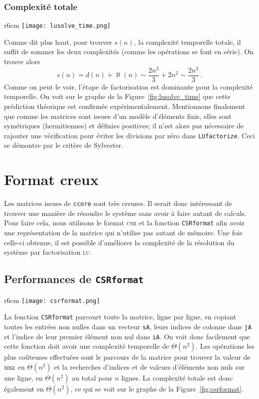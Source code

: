 \documentclass[11pt]{article}
\begin{document}
\subsubsection{Complexité totale}
\begin{wrapfigure}{r}{6cm}
	\centering
	\texttt{[image: lusolve\_time.png]}
	\caption{Temps d'exécution de \lstinline|LUsolve| en fonction de $n$. La pente de $3$ montre la relation cubique.}
	\label{fig:lusolve_time}
\end{wrapfigure}
Comme dit plus haut, pour trouver $s(n)$, la complexité temporelle totale, il suffit de sommer les deux complexités (comme les opérations se font en série).
On trouve alors
\[
s(n) = d(n) + \aleph(n) \sim \frac{2n^3}{3} + 2n^2 \sim \frac{2n^3}{3}\,.
\]
Comme on peut le voir, l'étape de factorisation est dominante pour la complexité temporelle. On voit sur le graphe de la Figure~\ref{fig:lusolve_time} que cette prédiction théorique est confirmée expérimentalement. Mentionnons finalement que comme les matrices sont issues d'un modèle d'éléments finis, elles sont symétriques (hermitiennes) et définies positives; il n'est alors pas nécessaire de rajouter une vérification pour éviter les divisions par zéro dans \lstinline|LUfactorize|. Ceci se démontre par le critère de Sylvester.
\section{Format creux}
Les matrices issues de \lstinline[language=bash]|ccore| sont très creuses.
Il serait donc intéressant de trouver une manière de résoudre le système sans avoir à faire autant de calculs.
Pour faire cela, nous utilisons le format \textsc{csr} et la fonction \lstinline|CSRformat| afin avoir une représentation de la matrice qui n'utilise pas autant de mémoire.
Une fois celle-ci obtenue, il est possible d'améliorer la complexité de la résolution du système par factorisation \textsc{lu}.
\subsection{Performances de \texttt{CSRformat}}
\label{sec:csrformat}
\begin{wrapfigure}{r}{6cm}
	\centering
	\texttt{[image: csrformat.png]}
	\caption{Temps d'exécution de \lstinline|CSRformat| en fonction de $n$. La pente de $2$ montre la relation quadratique.}
	\label{fig:csrformat}
\end{wrapfigure}
La fonction \lstinline|CSRformat| parcourt toute la matrice, ligne par ligne, en copiant toutes les entrées non nulles dans un vecteur \lstinline|sA|, leurs indices de colonne dans \lstinline|jA| et l'indice de leur premier élément non nul dans \lstinline|iA|.
On voit donc facilement que cette fonction doit avoir une complexité temporelle de $\Theta(n^2)$. Les opérations les plus coûteuses effectuées sont le parcours de la matrice pour trouver la valeur de $\textnormal{nnz}$ en $\Theta(n^2)$ et la recherches d'indices et de valeurs d'éléments non nuls sur une ligne, en $\Theta(n^2)$ au total pour $n$ lignes.
La complexité totale est donc également en $\Theta(n^2)$, ce qui se voit sur le graphe de la Figure~\ref{fig:csrformat}.
\end{document}
